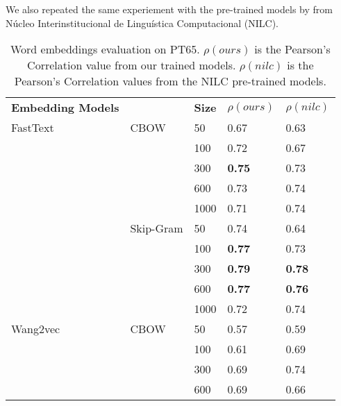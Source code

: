 We also repeated the same experiement with the pre-trained models by  from Núcleo Interinstitucional de Linguística Computacional (NILC).


\begin{table}[]
    \caption{Word embeddings evaluation on PT65. \textbf{$\rho(ours)$} is the Pearson’s Correlation value from our trained models. \textbf{$\rho(nilc)$} is the Pearson’s Correlation values from the NILC pre-trained models.}
    \label{tab:evaluation:we}
    \centering%
    \begin{minipage}{.65\textwidth}
    \begin{tabular}{@{}lllll@{}}
    \cmidrule(r){1-5}
    \textbf{Embedding Models} &      & \textbf{Size} & \textbf{$\rho(ours)$} & \textbf{$\rho(nilc)$} \\ \cmidrule(r){1-5}
    FastText            & CBOW          & 50   & 0.67             & 0.63            \\
                        &               & 100  & 0.72             & 0.67            \\
                        &               & 300  & \textbf{0.75}    & 0.73            \\
                        &               & 600  & 0.73             & 0.74            \\
                        &               & 1000 & 0.71             & 0.74            \\ \cmidrule(lr){2-5}
                        & Skip-Gram     & 50   & 0.74             & 0.64            \\
                        &               & 100  & \textbf{0.77}    & 0.73            \\
                        &               & 300  & \textbf{0.79}    & \textbf{0.78}   \\
                        &               & 600  & \textbf{0.77}    & \textbf{0.76}   \\
                        &               & 1000 & 0.72             & 0.74            \\ \cmidrule(r){1-5}
    Wang2vec            & CBOW          & 50   & 0.57             & 0.59            \\
                        &               & 100  & 0.61             & 0.69            \\
                        &               & 300  & 0.69             & 0.74            \\
                        &               & 600  & 0.69             & 0.66            \\

\end{tabular}
\end{minipage}
\end{table}
